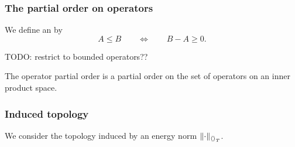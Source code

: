 \subsubsection{The partial order on operators}
\begin{definition}
We define an  by
\[ A\leq B \qquad\iff\qquad B-A \geq 0. \]
\end{definition}
TODO: restrict to bounded operators??

\begin{lemma}
The operator partial order is a partial order on the set of operators on an inner product space.
\end{lemma}

\subsubsection{Induced topology}
We consider the topology induced by an energy norm $\norm{\cdot}_{\inner{}_T}$.

